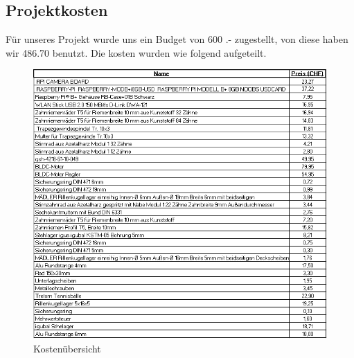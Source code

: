 \subsection{Projektkosten}
Für unseres Projekt wurde uns ein Budget von 600 .- zugestellt, von diese haben wir 486.70 benutzt. Die kosten wurden wie folgend aufgeteilt.
\begin{figure}[h!]
	\centering
	\includegraphics[width=\linewidth]{../../fig/Kosten}
	\caption{Kostenübersicht}
	\label{fig:Kostenübersicht}
\end{figure}
